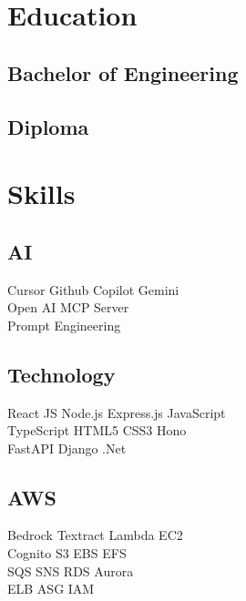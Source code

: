 \documentclass[]{deedy-resume-reversed}
\begin{document}
\begin{minipage}[t]{0.33\textwidth}

\section{Education}

\subsection{Bachelor of Engineering}
\sectionsep

\subsection{Diploma}
\sectionsep

\section{Skills}

\subsection{AI}
Cursor \textbullet Github Copilot \textbullet Gemini\\
Open AI \textbullet MCP Server \\
Prompt Engineering 
\sectionsep

\subsection{Technology}
React JS \textbullet Node.js \textbullet Express.js \textbullet JavaScript \\
TypeScript \textbullet HTML5 \textbullet CSS3 \textbullet Hono \\
FastAPI \textbullet Django \textbullet .Net
\sectionsep

\subsection{AWS}
Bedrock \textbullet Textract \textbullet Lambda \textbullet EC2 \\
Cognito \textbullet S3 \textbullet EBS \textbullet EFS \\
SQS \textbullet SNS \textbullet RDS \textbullet Aurora \\
ELB \textbullet ASG \textbullet IAM \\
\sectionsep


\end{minipage}
\end{document}
